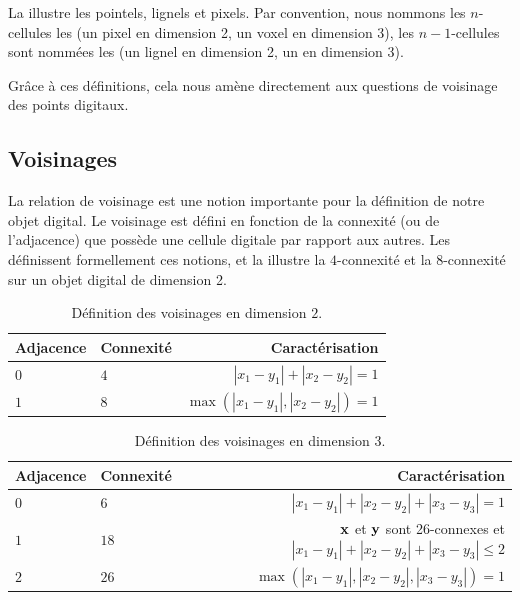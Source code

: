 La  illustre les pointels, lignels et pixels. Par
convention, nous nommons les $n$-cellules les  (un pixel en
dimension 2, un voxel en dimension 3), les $n-1$-cellules sont nommées les
 (un lignel en dimension 2, un  en dimension
3).

Grâce à ces définitions, cela nous amène directement aux questions de voisinage
des points digitaux.
%
\subsection{Voisinages}
\label{sec:voisinage}
%
La relation de voisinage est une notion importante pour la définition de notre
objet digital. Le voisinage est défini en fonction de la connexité (ou de
l'adjacence) que possède une cellule digitale par rapport aux autres. Les
 définissent formellement ces
notions, et la  illustre la $4$-connexité et la
$8$-connexité sur un objet digital de dimension 2.

\begin{table}[ht]
  \centering
  \caption{Définition des voisinages en dimension $2$.}
  \label{tab:adjacence2d}
    \renewcommand{\arraystretch}{1.1}
  \begin{tabular}{@{}llr@{}}
    \toprule
    Adjacence & Connexité  & Caractérisation \\ \midrule
    $0$ & $4$        & $|x_1 - y_1| + |x_2 - y_2| = 1$ \\
    $1$ & $8$        & $\max(|x_1 - y_1|,|x_2 - y_2|) = 1$ \\
    \bottomrule
  \end{tabular}
\end{table}

\begin{table}[ht]
  \centering
  \caption{Définition des voisinages en dimension $3$.}
  \label{tab:adjacence3d}
    \renewcommand{\arraystretch}{1.1}
  \begin{tabular}{@{}llr@{}}
    \toprule
    Adjacence & Connexité  & Caractérisation \\ \midrule
    $0$ & $6$        & $|x_1 - y_1| + |x_2 - y_2| + |x_3 - y_3| = 1$ \\
    $1$ & $18$       & $\mathbf{x}$ et $\mathbf{y}$ sont 26-connexes et $|x_1 - y_1| + |x_2 - y_2| + |x_3 - y_3| \le 2$ \\
    $2$ & $26$       & $\max(|x_1 - y_1|,|x_2 - y_2|,|x_3 - y_3|) = 1$ \\
    \bottomrule
  \end{tabular}
\end{table}

